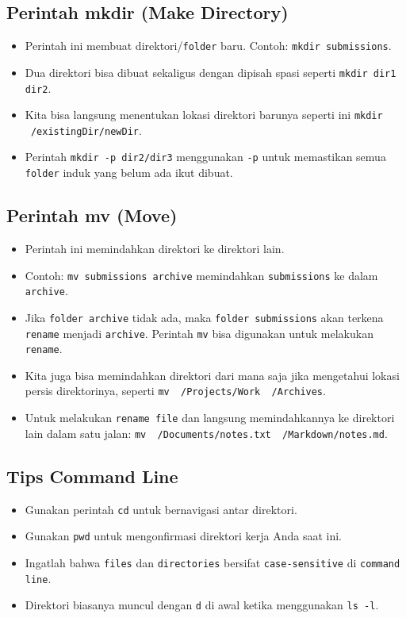 \documentclass{article}
\begin{document}
\subsection{Perintah mkdir (Make Directory)}
\begin{itemize}
    \item Perintah ini membuat direktori/\texttt{folder} baru. Contoh: \texttt{mkdir submissions}.
    \item Dua direktori bisa dibuat sekaligus dengan dipisah spasi seperti \texttt{mkdir dir1 dir2}.
    \item Kita bisa langsung menentukan lokasi direktori barunya seperti ini \texttt{mkdir ~/existingDir/newDir}.
    \item Perintah \texttt{mkdir -p dir2/dir3} menggunakan \texttt{-p} untuk memastikan semua \texttt{folder} induk yang belum ada ikut dibuat.
\end{itemize}

\subsection{Perintah mv (Move)}
\begin{itemize}
    \item Perintah ini memindahkan direktori ke direktori lain.
    \item Contoh: \texttt{mv submissions archive} memindahkan \texttt{submissions} ke dalam \texttt{archive}.
    \item Jika \texttt{folder archive} tidak ada, maka \texttt{folder submissions} akan terkena \texttt{rename} menjadi \texttt{archive}. Perintah \texttt{mv} bisa digunakan untuk melakukan \texttt{rename}.
    \item Kita juga bisa memindahkan direktori dari mana saja jika mengetahui lokasi persis direktorinya, seperti \texttt{mv ~/Projects/Work ~/Archives}.
    \item Untuk melakukan \texttt{rename file} dan langsung memindahkannya ke direktori lain dalam satu jalan: \texttt{mv ~/Documents/notes.txt ~/Markdown/notes.md}.
\end{itemize}

\subsection{Tips Command Line}
\begin{itemize}
    \item Gunakan perintah \texttt{cd} untuk bernavigasi antar direktori.
    \item Gunakan \texttt{pwd} untuk mengonfirmasi direktori kerja Anda saat ini.
    \item Ingatlah bahwa \texttt{files} dan \texttt{directories} bersifat \texttt{case-sensitive} di \texttt{command line}.
    \item Direktori biasanya muncul dengan \texttt{d} di awal ketika menggunakan \texttt{ls -l}.
\end{itemize}
\end{document}
